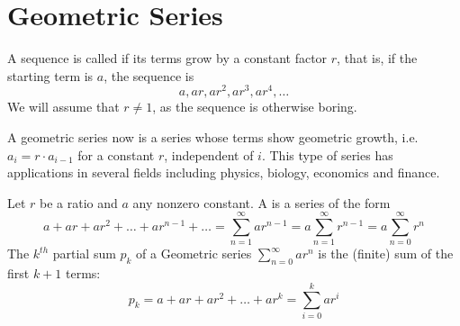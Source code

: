 \section{Geometric Series}

A sequence is called  if its terms grow by a constant
factor $r$, that is, if the starting term
is $a$, the sequence is
\[
a, ar, ar^2, ar^3, ar^4,\ldots
\]
We will assume that $r\not=1$, as the sequence is otherwise boring.

%
%

A geometric series now is a series whose terms show geometric growth, i.e.
$a_i=r\cdot a_{i-1}$ for a constant $r$, independent of $i$.
This type of series has applications in several fields
including physics, biology, economics and finance.

\begin{defn}
Let $r$ be a ratio and $a$ any nonzero constant. A 
is a series of the form
\[
a+ ar + ar^{2}+ \ldots + ar^{n-1}+ \ldots = \sum_{n=1}^{\infty}
ar^{n-1} =a\sum_{n=1}^\infty r^{n-1}=a\sum_{n=0}^\infty r^n
\]
The $k^{th}$ partial sum $p_{k}$ of a Geometric series
$\displaystyle{\sum_{n=0}^{\infty} ar^{n}}$ is the (finite) sum of
the first $k+1$ terms:
\[
p_{k} = a + ar + ar^{2} + \ldots + ar^k =
\sum_{i=0}^k ar^{i}
\]
\end{defn}


